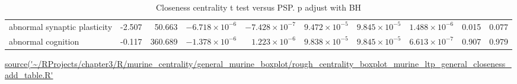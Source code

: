 \begin{table}[ht]
\begin{adjustbox}{width=\textwidth}
\begin{tabular}{lrrrrrrrrr}
  abnormal synaptic plasticity & -2.507 & 50.663 & $-6.718 \times 10^{-6}$ & $-7.428 \times 10^{-7}$ & $9.472 \times 10^{-5}$ & $9.845 \times 10^{-5}$ & $1.488 \times 10^{-6}$ & 0.015 & 0.077 \\ 
  abnormal cognition & -0.117 & 360.689 & $-1.378 \times 10^{-6}$ & $1.223 \times 10^{-6}$ & $9.838 \times 10^{-5}$ & $9.845 \times 10^{-5}$ & $6.613 \times 10^{-7}$ & 0.907 & 0.979 \\ 
   \bottomrule
\end{tabular}
\end{adjustbox}
\caption{Closeness centrality t test versus PSP. p adjust with BH}
\tiny\url{source('~/RProjects/chapter3/R/murine_centrality/general_murine_boxplot/rough_centrality_boxplot_murine_ltp_general_closeness_add_table.R'}

\end{table}

